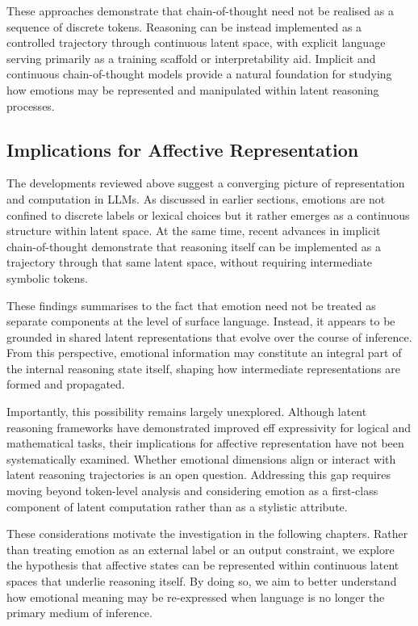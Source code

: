 \documentclass[12pt,twoside]{report}
\begin{document}
These approaches demonstrate that chain-of-thought need not be realised as a sequence of discrete tokens. Reasoning can be instead implemented as a controlled trajectory through continuous latent space, with explicit language serving primarily as a training scaffold or interpretability aid.  Implicit and continuous chain-of-thought models provide a natural foundation for studying how emotions may be represented and manipulated within latent reasoning processes.

\subsection{Implications for Affective Representation}

The developments reviewed above suggest a converging picture of representation and computation in LLMs. As discussed in earlier sections, emotions are not confined to discrete labels or lexical choices but it rather emerges as a continuous structure within latent space. At the same time, recent advances in implicit chain-of-thought demonstrate that reasoning itself can be implemented as a trajectory through that same latent space, without requiring intermediate symbolic tokens.

These findings summarises to the fact that emotion need not be treated as separate components at the level of surface language. Instead, it appears to be grounded in shared latent representations that evolve over the course of inference. From this perspective, emotional information may constitute an integral part of the internal reasoning state itself, shaping how intermediate representations are formed and propagated.

Importantly, this possibility remains largely unexplored. Although latent reasoning frameworks have demonstrated improved eff expressivity for logical and mathematical tasks, their implications for affective representation have not been systematically examined. Whether emotional dimensions align or interact with latent reasoning trajectories is an open question. Addressing this gap requires moving beyond token-level analysis and considering emotion as a first-class component of latent computation rather than as a stylistic attribute.

These considerations motivate the investigation in the following chapters. Rather than treating emotion as an external label or an output constraint, we explore the hypothesis that affective states can be represented within continuous latent spaces that underlie reasoning itself. By doing so, we aim to better understand how emotional meaning may be re-expressed when language is no longer the primary medium of inference.
\end{document}
